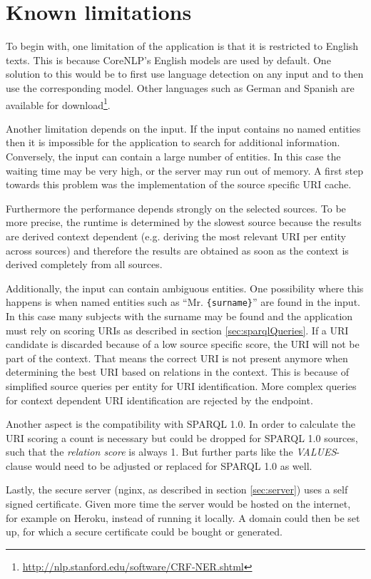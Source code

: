 \newpage
\section{Known limitations}
\label{sec:Limits}
To begin with, one limitation of the application is that it is restricted to English texts. This is because CoreNLP's English models are used by default. One solution to this would be to first use language detection on any input and to then use the corresponding model. Other languages such as German and Spanish are available for download\footnote{\url{http://nlp.stanford.edu/software/CRF-NER.shtml}}. 

Another limitation depends on the input. If the input contains no named entities then it is impossible for the application to search for additional information. Conversely, the input can contain a large number of entities. In this case the waiting time may be very high, or the server may run out of memory. A first step towards this problem was the implementation of the source specific URI cache. 

Furthermore the performance depends strongly on the selected sources. To be more precise, the runtime is determined by the slowest source because the results are derived context dependent (e.g. deriving the most relevant URI per entity across sources) and therefore the results are obtained as soon as the context is derived completely from all sources. 

Additionally, the input can contain ambiguous entities. One possibility where this happens is when named entities such as ``Mr. \texttt{\{surname\}}'' are found in the input. In this case many subjects with the surname may be found and the application must rely on scoring URIs as described in section \ref{sec:sparqlQueries}. If a URI candidate is discarded because of a low source specific score, the URI will not be part of the context. That means the correct URI is not present anymore when determining the best URI based on relations in the context. This is because of simplified source queries per entity for URI identification. More complex queries for context dependent URI identification are rejected by the endpoint.

Another aspect is the compatibility with SPARQL 1.0. In order to calculate the URI scoring a count is necessary but could be dropped for SPARQL 1.0 sources, such that the \textit{relation score} is always 1. But further parts like the \textit{VALUES}-clause would need to be adjusted or replaced for SPARQL 1.0 as well. 

Lastly, the secure server (nginx, as described in section \ref{sec:server}) uses a self signed certificate. Given more time the server would be hosted on the internet, for example on Heroku, instead of running it locally. A domain could then be set up, for which a secure certificate could be bought or generated. 




